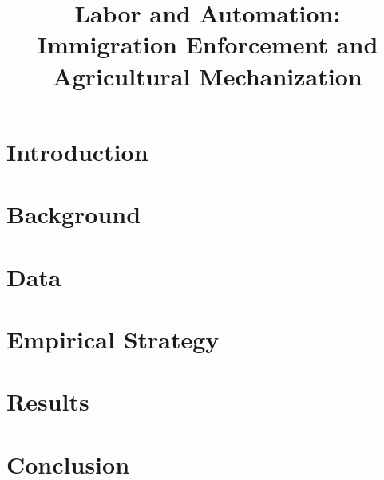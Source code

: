 \documentclass[12pt]{article}
\title{Labor and Automation: Immigration Enforcement and Agricultural Mechanization}
\author{}
\date{}
\begin{document}
\maketitle

\begin{abstract}

\end{abstract}

\section{Introduction}

\section{Background}

\section{Data}

\section{Empirical Strategy}

\section{Results}

\section{Conclusion}



\end{document}
